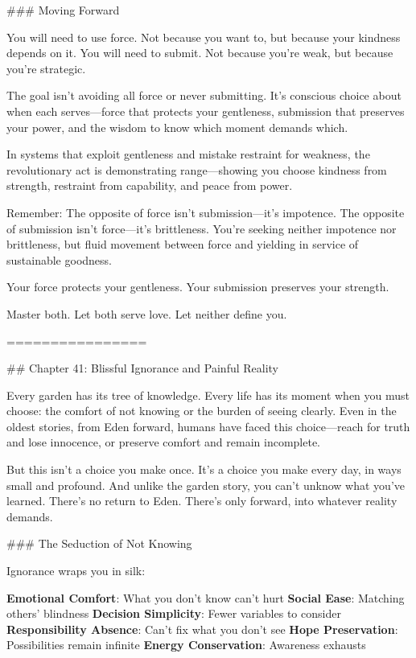 \documentclass[12pt]{book}
\begin{document}
\#\#\# Moving Forward

You will need to use force. Not because you want to, but because your kindness depends on it. You will need to submit. Not because you're weak, but because you're strategic.

The goal isn't avoiding all force or never submitting. It's conscious choice about when each serves—force that protects your gentleness, submission that preserves your power, and the wisdom to know which moment demands which.

In systems that exploit gentleness and mistake restraint for weakness, the revolutionary act is demonstrating range—showing you choose kindness from strength, restraint from capability, and peace from power.

Remember: The opposite of force isn't submission—it's impotence. The opposite of submission isn't force—it's brittleness. You're seeking neither impotence nor brittleness, but fluid movement between force and yielding in service of sustainable goodness.

Your force protects your gentleness. Your submission preserves your strength.

Master both. Let both serve love. Let neither define you.

================

\#\# Chapter 41: Blissful Ignorance and Painful Reality

Every garden has its tree of knowledge. Every life has its moment when you must choose: the comfort of not knowing or the burden of seeing clearly. Even in the oldest stories, from Eden forward, humans have faced this choice—reach for truth and lose innocence, or preserve comfort and remain incomplete.

But this isn't a choice you make once. It's a choice you make every day, in ways small and profound. And unlike the garden story, you can't unknow what you've learned. There's no return to Eden. There's only forward, into whatever reality demands.

\#\#\# The Seduction of Not Knowing

Ignorance wraps you in silk:

\textbf{Emotional Comfort}: What you don't know can't hurt
\textbf{Social Ease}: Matching others' blindness
\textbf{Decision Simplicity}: Fewer variables to consider
\textbf{Responsibility Absence}: Can't fix what you don't see
\textbf{Hope Preservation}: Possibilities remain infinite
\textbf{Energy Conservation}: Awareness exhausts
\end{document}
